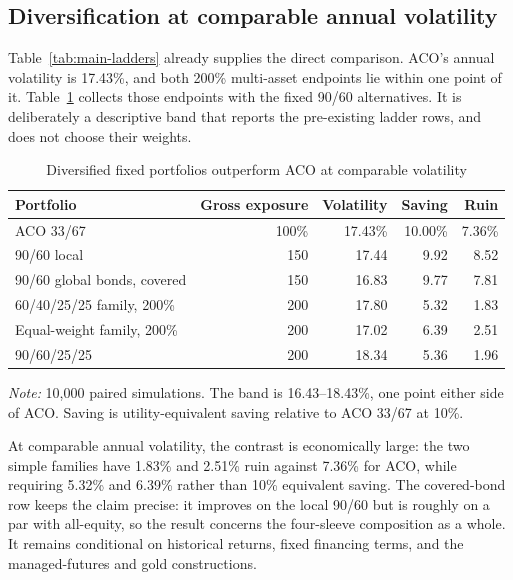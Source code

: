 \documentclass[11pt]{article}
\begin{document}
\subsection{Diversification at comparable annual volatility}
\label{sec:comparable-risk}

Table~\ref{tab:main-ladders} already supplies the direct comparison. ACO's
annual volatility is 17.43\%, and both 200\% multi-asset endpoints lie within
one point of it. Table~\ref{tab:main-similar-volatility} collects those endpoints
with the fixed 90/60 alternatives. It is deliberately a descriptive band that
reports the pre-existing ladder rows, and does not choose their weights.

\begin{table}[t]
\centering
\caption{Diversified fixed portfolios outperform ACO at comparable volatility}
\label{tab:main-similar-volatility}
\begin{tabular}{lrrrr}
\toprule
Portfolio & Gross exposure & Volatility & Saving & Ruin \\
\midrule
ACO 33/67 & 100\% & 17.43\% & 10.00\% & 7.36\% \\
90/60 local & 150 & 17.44 & 9.92 & 8.52 \\
90/60 global bonds, covered & 150 & 16.83 & 9.77 & 7.81 \\
60/40/25/25 family, 200\% & 200 & 17.80 & 5.32 & 1.83 \\
Equal-weight family, 200\% & 200 & 17.02 & 6.39 & 2.51 \\
90/60/25/25 & 200 & 18.34 & 5.36 & 1.96 \\
\bottomrule
\end{tabular}
\begin{minipage}{0.95\textwidth}\footnotesize
\textit{Note:} 10,000 paired simulations. The band is 16.43--18.43\%, one
point either side of ACO. Saving is utility-equivalent saving relative to ACO
33/67 at 10\%.
\end{minipage}
\end{table}

At comparable annual volatility, the contrast is economically large: the two
simple families have 1.83\% and 2.51\% ruin against 7.36\% for ACO, while
requiring 5.32\% and 6.39\% rather than 10\% equivalent saving. The covered-bond
row keeps the claim precise: it improves on the local 90/60 but is
roughly on a par with all-equity, so the result concerns the four-sleeve
composition as a whole. It remains conditional on historical returns, fixed
financing terms, and the managed-futures and gold constructions.
\end{document}

